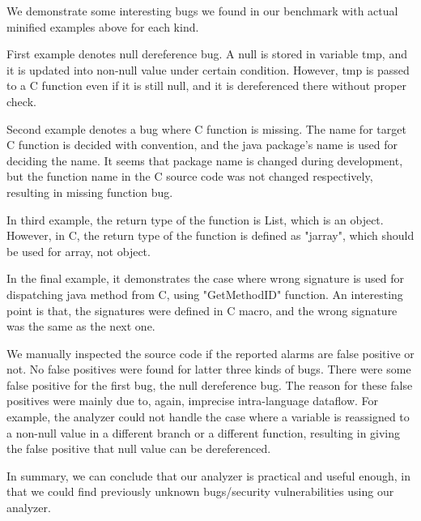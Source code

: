We demonstrate some interesting bugs we found in our benchmark with actual minified examples above
for each kind.

First example denotes null dereference bug. A null is stored in variable tmp, and
it is updated into non-null value under certain condition. However, tmp is passed
to a C function even if it is still null, and it is dereferenced there
without proper check.

Second example denotes a bug where C function is missing. The name for target C
function is decided with convention, and the java package's name is used
for deciding the name. It seems that package name is changed during development,
but the function name in the C source code was not changed respectively, resulting
in missing function bug.

In third example, the return type of the function is List, which is an object.
However, in C, the return type of the function is defined as "jarray", which
should be used for array, not object.

In the final example, it demonstrates the case where wrong signature is used
for dispatching java method from C, using "GetMethodID" function. An interesting
point is that, the signatures were defined in C macro, and the wrong signature
was the same as the next one.

We manually inspected the source code if the reported alarms are false positive
or not. No false positives were found for latter three kinds of bugs.  There
were some false positive for the first bug, the null dereference bug. The
reason for these false positives were mainly due to, again, imprecise
intra-language dataflow. For example, the analyzer could not handle the case
where a variable is reassigned to a non-null value in a different branch or a
different function, resulting in giving the false positive that null value can
be dereferenced.

In summary, we can conclude that our analyzer is practical and useful enough,
in that we could find previously unknown bugs/security vulnerabilities using
our analyzer.
